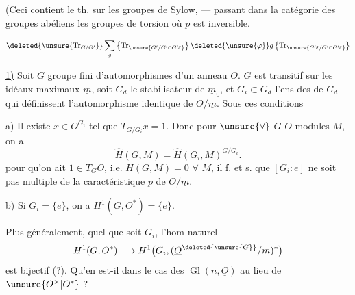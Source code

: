 (Ceci contient le th. sur les groupes de Sylow,  --- passant dans la catégorie des groupes abéliens  les groupes de torsion où $p$ est inversible.

 
\[
\deleted{\unsure{\operatorname{Tr}_{G/G'}}}\sum_g\left\{\operatorname{Tr}_{\unsure{G'/G'\cap G'^g}}\right\}\deleted{\unsure{\varphi}}g\left\{\operatorname{Tr}_{\unsure{G'^g/G'\cap G'^g}}\right\}
\]


\uline{1)} Soit $G$ groupe fini d'automorphismes d'un anneau  $O$.
$G$ est transitif sur les idéaux maximaux $\underline m$, soit $G_d$ le stabilisateur de $\underline m_0$, et $G_i\subset G_d$ l'ens des  de $G_d$ qui définissent l'automorphisme identique de $O/\underline m$.
Sous ces conditions

a) Il existe $x\in O^{G_i}$ tel que $T_{G/G_i}x=1$. Donc pour $\unsure{\forall}$ $G$-$O$-modules $M$, on a
\[
\widehat H(G,M)=\widehat H(G_i,M)^{G/G_i}.
\]
 pour qu'on ait $1\in T_G O$, i.e. $\widehat H(G,M)=0$ $\forall$ $M$, il f. et s. que $[G_i:e]$ ne soit pas multiple de la caractéristique $p$ de $O/\underline m$.

b) Si $G_i=\{e\}$, on a $H^1(G,O^*)=\{e\}$.

Plus généralement, quel que soit $G_i$, l'hom naturel
\[
H^1(G,O^*)\longrightarrow H^1\bigl(G_i,(\underline O^{\deleted{\unsure{G}}}/m)^*\bigr)
\]
est bijectif (?). Qu'en est-il dans le cas  des $\operatorname{Gl}(n,\underline O)$ au lieu de $\unsure{O^\times|O^*}$ ?

